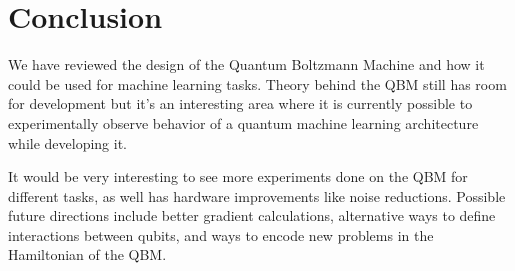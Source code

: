 \documentclass[letterpaper,11pt]{article}
\begin{document}
\section{Conclusion}
We have reviewed the design of the Quantum Boltzmann Machine and how it could be used for machine learning tasks. Theory behind the QBM still has room for development but it's an interesting area where it is currently possible to experimentally observe behavior of a quantum machine learning architecture while developing it. \par

It would be very interesting to see more experiments done on the QBM for different tasks, as well has hardware improvements like noise reductions. Possible future directions include better gradient calculations, alternative ways to define interactions between qubits, and ways to encode new problems in the Hamiltonian of the QBM. 




\end{document}
